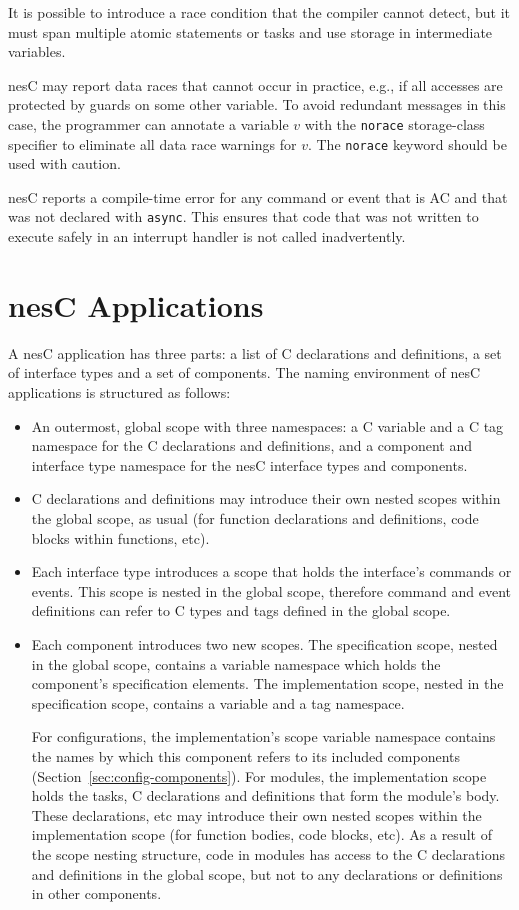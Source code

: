 \documentclass[11pt,letterpaper]{article}
\newcommand{\kw}[1]{{\tt #1}}
\newcommand{\nesc}{nesC\xspace}
\begin{document}
It is possible to introduce a race condition that the compiler cannot
detect, but it must span multiple atomic statements or tasks and use storage
in intermediate variables.

\nesc may report data races that cannot occur in practice, e.g., if all
accesses are protected by guards on some other variable. To avoid redundant
messages in this case, the programmer can annotate a variable $v$ with the
\kw{norace} storage-class specifier to eliminate all data race warnings for
$v$. The \kw{norace} keyword should be used with caution.

\nesc reports a compile-time error for any command or event that is AC and
that was not declared with \kw{async}. This ensures that code that was not
written to execute safely in an interrupt handler is not called
inadvertently.

\section{\nesc Applications}
\label{sec:app}

A \nesc application has three parts: a list of C declarations and
definitions, a set of interface types and a set of components. The naming
environment of \nesc applications is structured as follows:
\begin{itemize}
\item An outermost, global scope with three namespaces: a C variable and a
C tag namespace for the C declarations and definitions, and a component and
interface type namespace for the \nesc interface types and components.
\item C declarations and definitions may introduce their own nested scopes
within the global scope, as usual (for function declarations and
definitions, code blocks within functions, etc).

\item Each interface type introduces a scope that holds the interface's
commands or events. This scope is nested in the global scope, therefore
command and event definitions can refer to C types and tags defined in the
global scope.

\item Each component introduces two new scopes. The specification scope,
nested in the global scope, contains a variable namespace which holds the
component's specification elements. The implementation scope, nested in the
specification scope, contains a variable and a tag namespace. 

For configurations, the implementation's scope variable namespace contains
the names by which this component refers to its included components
(Section~\ref{sec:config-components}). For modules, the implementation
scope holds the tasks, C declarations and definitions that form the
module's body. These declarations, etc may introduce their own nested
scopes within the implementation scope (for function bodies, code blocks,
etc). As a result of the scope nesting structure, code in modules has
access to the C declarations and definitions in the global scope, but not
to any declarations or definitions in other components.
\end{itemize}
\end{document}
